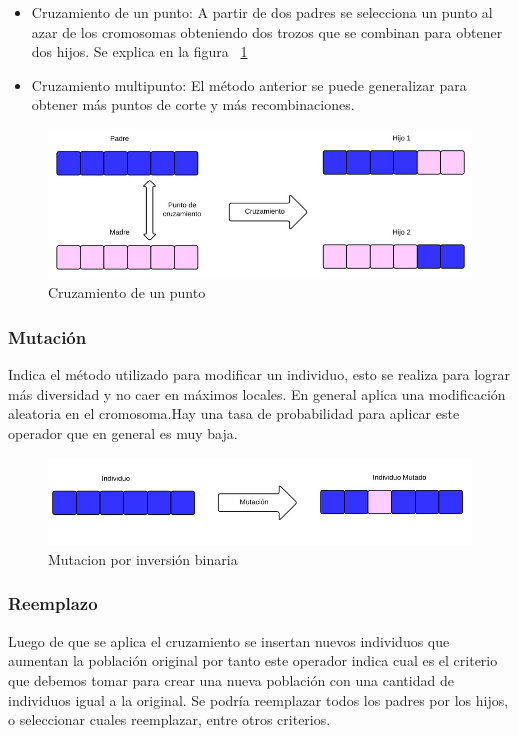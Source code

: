 \begin{itemize}
	\item Cruzamiento de un punto: A partir de dos padres se selecciona un punto al azar de los cromosomas obteniendo dos trozos que se combinan para obtener dos hijos. Se explica en la figura ~\ref{fig:cruzamiento1}
	\item Cruzamiento multipunto: El método anterior se puede generalizar para obtener más puntos de corte y más recombinaciones.
\end{itemize}

\begin{figure}[h]
	\centering
	\includegraphics[width=\textwidth]{Figures/cruzamiento1}
	\caption{Cruzamiento de un punto}
	\label{fig:cruzamiento1}
\end{figure}

\subsubsection{Mutación} 
Indica el método utilizado para modificar un individuo, esto se realiza para lograr más diversidad y no caer en máximos locales. En general aplica una modificación aleatoria en el cromosoma.Hay una tasa de probabilidad para aplicar este operador que en general es muy baja. 
\begin{figure}[h]
	\centering
	\includegraphics[width=1\linewidth]{Figures/mutacion1}
	\caption{Mutacion por inversión binaria}
	\label{fig:mutacion1}
\end{figure}


\subsubsection{Reemplazo} 
Luego de que se aplica el cruzamiento se insertan nuevos individuos que aumentan la población original por tanto este operador indica cual es el criterio que debemos tomar para crear una nueva población con una cantidad de individuos igual a la original.
Se podría reemplazar todos los padres por los hijos, o seleccionar cuales reemplazar, entre otros criterios.

